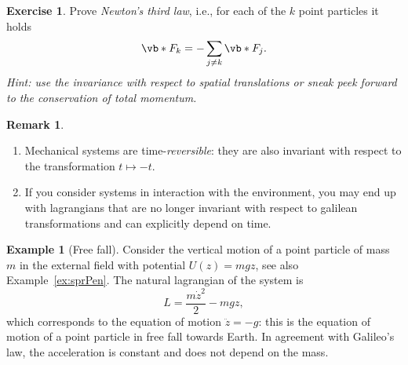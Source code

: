 \documentclass[english,fontsize=11pt,paper=b5]{scrbook}
\numberwithin{equation}{chapter}
\theoremstyle{definition}
\newtheorem{remark}{Remark}[chapter]
\newtheorem{example}{Example}[chapter]
\newtheorem{exercise}{Exercise}[chapter]
\begin{document}
    \begin{exercise}\label{ex:N3l1}
      Prove \emph{Newton's third law}, i.e., for each of the $k$ point particles it holds
      \begin{equation}
        \vb*{F}_k = -\sum_{j\neq k} \vb*{F}_j.
      \end{equation}
      \textit{Hint: use the invariance with respect to spatial translations or sneak peek forward to the conservation of total momentum.}
    \end{exercise}

    \begin{remark}
      \begin{enumerate}
        \item Mechanical systems are time-\emph{reversible}: they are also invariant with respect to the transformation $t\mapsto -t$.
        \item If you consider systems in interaction with the environment, you may end up with lagrangians that are no longer invariant with respect to galilean transformations and can explicitly depend on time.
      \end{enumerate}
    \end{remark}

    \begin{example}[Free fall]
      Consider the vertical motion of a point particle of mass $m$ in the external field with potential $U(z) = m g z$, see also Example~\ref{ex:sprPen}. The natural lagrangian of the system is
      \begin{equation}
        L = \frac{m\dot z^2}2 - mgz,
      \end{equation}
      which corresponds to the equation of motion $\ddot z = -g$: this is the equation of motion of a point particle in free fall towards Earth. In agreement with Galileo's law, the acceleration is constant and does not depend on the mass.
    \end{example}
\end{document}
